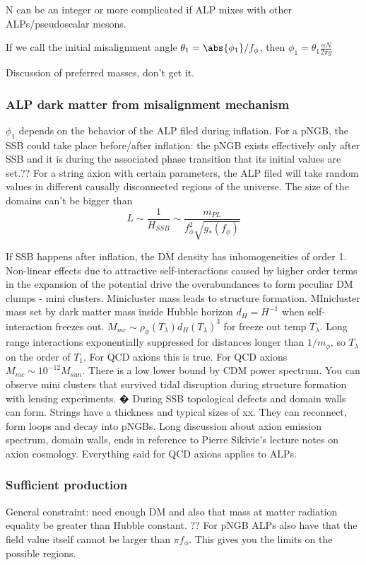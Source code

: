\documentclass[11pt]{book}
\begin{document}
N can be an integer or more complicated if ALP mixes with other ALPs/pseudoscalar mesons.

If we call the initial misalignment angle $\theta_1 = \abs{\phi_1}/f_{\phi}$, then $\phi_1 = \theta_1 \frac{\alpha N}{2 \pi g}$

Discussion of preferred masses, don't get it.

\subsubsection{ALP dark matter from misalignment mechanism}

$\phi_1$ depends on the behavior of the ALP filed during inflation. For a pNGB, the SSB could take place before/after inflation: the pNGB exists effectively only after SSB and it is during the associated phase transition that its initial values are set.?? For a string axion with certain parameters, the ALP filed will take random values in different causally disconnected regions of the universe. The size of the domains can't be bigger than
\[
L \sim \frac{1}{H_{SSB}} \sim \frac{m_{PL}}{f_\phi^2\sqrt{g_*(f_\phi)}}
\]

If SSB happens after inflation, the DM density has inhomogeneities of order 1. Non-linear effects due to attractive self-interactions caused by higher order terms in the expansion of the potential drive the overabundances to form peculiar DM clumps - mini clusters. Minicluster mass leads to structure formation. MInicluster mass set by dark matter mass inside Hubble horizon $d_H = H^{-1}$ when self-interaction freezes out. $M_{mc} \sim \rho_{\phi}(T_\lambda)d_H(T_\lambda)^3$ for freeze out temp $T_\lambda$. Long range interactions exponentially suppressed for distances longer than $1/m_\phi$, so $T_\lambda$ on the order of $T_1$. For QCD axions this is true. For QCD axions $M_{mc} \sim 10^{-12} M_{sun}$. There is a low lower bound by CDM power spectrum.
You can observe mini clusters that survived tidal disruption during structure formation with lensing experiments. �
During SSB topological defects and domain walls can form. Strings have a thickness and typical sizes of xx. They can reconnect, form loops and decay into pNGBs. Long discussion about axion emission spectrum, domain walls, ends in reference to Pierre Sikivie's lecture notes on axion cosmology. Everything said for QCD axions applies to ALPs.

\subsubsection{Sufficient production}
General constraint: need enough DM and also that mass at matter radiation equality be greater than Hubble constant. ??
For pNGB ALPs also have that the field value itself cannot be larger than $\pi f_\phi$. This gives you the limits on the possible regions.
\end{document}
